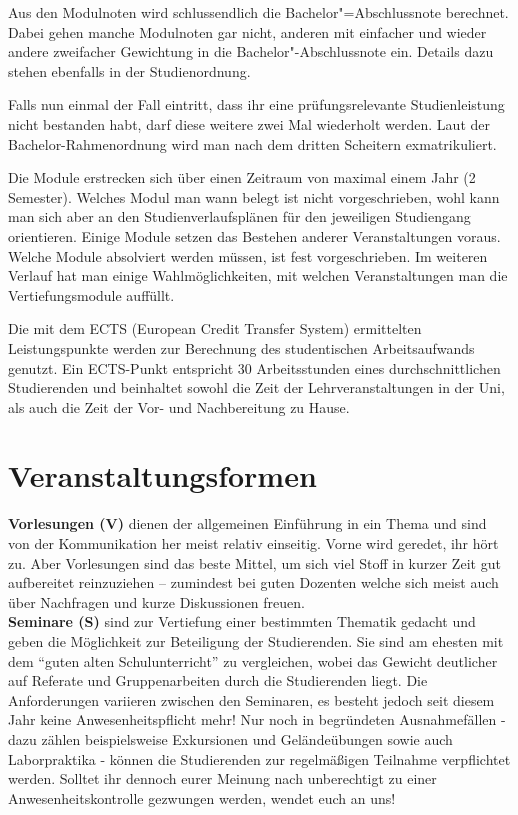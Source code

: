 Aus den Modulnoten wird schlussendlich die Bachelor"=Abschlussnote berechnet. Dabei gehen manche Modulnoten gar nicht, anderen mit einfacher und wieder andere zweifacher Gewichtung in die Bachelor"-Abschlussnote ein. Details dazu stehen ebenfalls in der Studienordnung.

Falls nun einmal der Fall eintritt, dass ihr eine prüfungsrelevante Studienleistung nicht bestanden habt, darf diese weitere zwei Mal wiederholt werden. Laut der Bachelor-Rahmenordnung wird man nach dem dritten Scheitern exmatrikuliert.

Die Module erstrecken sich über einen Zeitraum von maximal einem Jahr (2 Semester). Welches Modul man wann belegt ist nicht vorgeschrieben, wohl kann man sich aber an den Studienverlaufsplänen für den jeweiligen Studiengang orientieren. Einige Module setzen das Bestehen anderer Veranstaltungen voraus. Welche Module absolviert werden müssen, ist fest vorgeschrieben. Im weiteren Verlauf hat man einige Wahlmöglichkeiten, mit welchen Veranstaltungen man die Vertiefungsmodule auffüllt.

Die mit dem ECTS (European Credit Transfer System) ermittelten Leistungspunkte werden zur Berechnung des studentischen Arbeitsaufwands genutzt. Ein ECTS-Punkt entspricht 30 Arbeitsstunden eines durchschnittlichen Studierenden und beinhaltet sowohl die Zeit der Lehrveranstaltungen in der Uni, als auch die Zeit der Vor- und Nachbereitung zu Hause.

\section{Veranstaltungsformen}
\textbf{Vorlesungen (V)} dienen der allgemeinen Einführung in ein Thema und sind von der Kommunikation her meist relativ einseitig. Vorne wird geredet, ihr hört zu. Aber Vorlesungen sind das beste Mittel, um sich viel Stoff in kurzer Zeit gut aufbereitet reinzuziehen – zumindest bei guten Dozenten welche sich meist auch über Nachfragen und kurze Diskussionen freuen.
\\
\textbf{Seminare (S)} sind zur Vertiefung einer bestimmten Thematik gedacht und geben die Möglichkeit zur Beteiligung der Studierenden. Sie sind am ehesten mit dem "`guten alten Schulunterricht"' zu vergleichen, wobei das Gewicht deutlicher auf Referate und Gruppenarbeiten durch die Studierenden liegt. Die Anforderungen variieren zwischen den Seminaren, es besteht jedoch seit diesem Jahr keine Anwesenheitspflicht mehr! Nur noch in begründeten Ausnahmefällen - dazu zählen beispielsweise Exkursionen und Geländeübungen sowie auch Laborpraktika - können die Studierenden zur regelmäßigen Teilnahme verpflichtet werden. Solltet ihr dennoch eurer Meinung nach unberechtigt zu einer Anwesenheitskontrolle gezwungen werden, wendet euch an uns!

